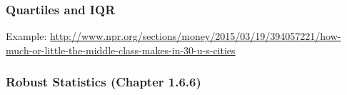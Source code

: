 \documentclass[handout]{beamer}
\newcommand{\blue}[1]{\textcolor{blue2}{#1}}
\begin{document}
%
%
%
%


\begin{frame}
\frametitle{Quartiles and IQR}

Example: 
\blue{\url{http://www.npr.org/sections/money/2015/03/19/394057221/how-much-or-little-the-middle-class-makes-in-30-u-s-cities}}

\end{frame}


\begin{frame}
\frametitle{Robust Statistics (Chapter 1.6.6)}
%
%
%
%
%
%
\end{frame}
\end{document}
